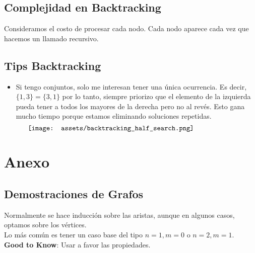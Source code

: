 \documentclass[10pt,a4paper]{article}
\begin{document}
\subsection*{Complejidad en Backtracking}
Consideramos el costo de procesar cada nodo. Cada nodo aparece cada vez que hacemos un llamado recursivo.  
\subsection*{Tips Backtracking}
\begin{itemize}
    \item Si tengo conjuntos, solo me interesan tener una única ocurrencia. Es decir, $\{1, 3\} = \{3, 1\}$ por lo tanto, siempre priorizo que el elemento de la izquierda pueda tener a todos los mayores de la derecha pero no al revés. Esto gana mucho tiempo porque estamos eliminando soluciones repetidas.
    \[\begin{minipage}[b]{0.9\textwidth}
    \texttt{[image: assets/backtracking\_half\_search.png]}
    \end{minipage}\]
\end{itemize}
\section*{Anexo}
\subsection*{Demostraciones de Grafos}
Normalmente se hace inducción sobre las aristas, aunque en algunos casos, optamos sobre los vértices. \\
Lo más común es tener un caso base del tipo $n=1, m=0$ o $n=2, m=1$. \\
\textbf{Good to Know}: Usar a favor las propiedades.
\end{document}
